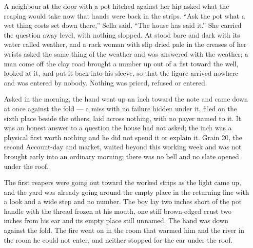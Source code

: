 A neighbour at the door with a pot hitched against her hip asked what the reaping would take now that hands were back in the strips. “Ask the pot what a wet thing costs set down there,” Sella said. “The house has said it.” She carried the question away level, with nothing slopped. At   stood bare and dark with its water called weather, and a rack woman with slip dried pale in the creases of her wrists asked the same thing of the weather and was answered with the weather; a man come off the clay road brought a number up out of a fist toward the well, looked at it, and put it back into his sleeve, so that the figure arrived nowhere and was entered by nobody. Nothing was priced, refused or entered.

Asked in the morning, the hand went up an inch toward the note and came down at once against the fold --- a miss with no failure hidden under it, filed on the sixth place beside the others, laid across nothing, with no payer named to it. It was an honest answer to a question the house had not asked; the inch was a physical first worth nothing and he did not spend it or explain it. Grain 20, the second Account-day and market, waited beyond this working week and was not brought early into an ordinary morning; there was no bell and no slate opened under the roof.

The first reapers were going out toward the worked strips as the light came up, and the yard was already going around the empty place in the returning line with a look and a wide step and no number. The boy lay two inches short of the pot handle with the thread frozen at his mouth, one stiff brown-edged crust two inches from his ear and its empty place still unnamed. The hand was down against the fold. The fire went on in the room that warmed him and the river in the room he could not enter, and neither stopped for the ear under the roof.
